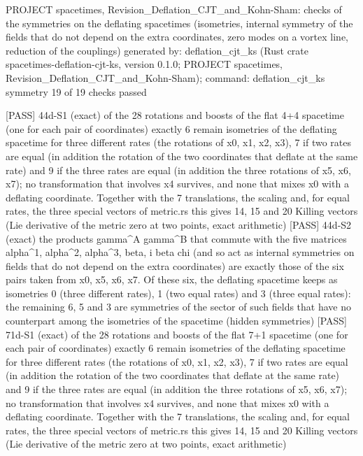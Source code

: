 \documentclass[
  10pt,
]{article}
\newenvironment{Shaded}{}{}
\newcommand{\NormalTok}[1]{#1}
\begin{document}
\begin{Shaded}
\begin{Highlighting}[]
\NormalTok{PROJECT spacetimes, Revision\_Deflation\_CJT\_and\_Kohn{-}Sham: checks of the symmetries on the deflating spacetimes (isometries, internal symmetry of the fields that do not depend on the extra coordinates, zero modes on a vortex line, reduction of the couplings)}
\NormalTok{generated by: deflation\_cjt\_ks (Rust crate spacetimes{-}deflation{-}cjt{-}ks, version 0.1.0; PROJECT spacetimes, Revision\_Deflation\_CJT\_and\_Kohn{-}Sham); command: deflation\_cjt\_ks symmetry}
\NormalTok{19 of 19 checks passed}

\NormalTok{[PASS] 44d{-}S1  (exact) of the 28 rotations and boosts of the flat 4+4 spacetime (one for each pair of coordinates) exactly 6 remain isometries of the deflating spacetime for three different rates (the rotations of x0, x1, x2, x3), 7 if two rates are equal (in addition the rotation of the two coordinates that deflate at the same rate) and 9 if the three rates are equal (in addition the three rotations of x5, x6, x7); no transformation that involves x4 survives, and none that mixes x0 with a deflating coordinate. Together with the 7 translations, the scaling and, for equal rates, the three special vectors of metric.rs this gives 14, 15 and 20 Killing vectors (Lie derivative of the metric zero at two points, exact arithmetic)}
\NormalTok{[PASS] 44d{-}S2  (exact) the products gamma\^{}A gamma\^{}B that commute with the five matrices alpha\^{}1, alpha\^{}2, alpha\^{}3, beta, i beta chi (and so act as internal symmetries on fields that do not depend on the extra coordinates) are exactly those of the six pairs taken from x0, x5, x6, x7. Of these six, the deflating spacetime keeps as isometries 0 (three different rates), 1 (two equal rates) and 3 (three equal rates): the remaining 6, 5 and 3 are symmetries of the sector of such fields that have no counterpart among the isometries of the spacetime (hidden symmetries)}
\NormalTok{[PASS] 71d{-}S1  (exact) of the 28 rotations and boosts of the flat 7+1 spacetime (one for each pair of coordinates) exactly 6 remain isometries of the deflating spacetime for three different rates (the rotations of x0, x1, x2, x3), 7 if two rates are equal (in addition the rotation of the two coordinates that deflate at the same rate) and 9 if the three rates are equal (in addition the three rotations of x5, x6, x7); no transformation that involves x4 survives, and none that mixes x0 with a deflating coordinate. Together with the 7 translations, the scaling and, for equal rates, the three special vectors of metric.rs this gives 14, 15 and 20 Killing vectors (Lie derivative of the metric zero at two points, exact arithmetic)}

\end{Highlighting}
\end{Shaded}
\end{document}
